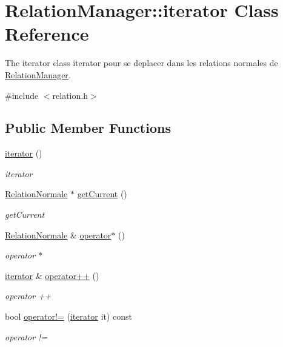 \hypertarget{class_relation_manager_1_1iterator}{}\section{Relation\+Manager\+:\+:iterator Class Reference}
\label{class_relation_manager_1_1iterator}


The iterator class iterator pour se deplacer dans les relations normales de \hyperlink{class_relation_manager}{Relation\+Manager}.  




{\ttfamily \#include $<$relation.\+h$>$}

\subsection*{Public Member Functions}
\begin{DoxyCompactItemize}
\item 
\mbox{\label{class_relation_manager_1_1iterator_a080be746b159c37d0d7b1d825c2f1866}} 
\hyperlink{class_relation_manager_1_1iterator_a080be746b159c37d0d7b1d825c2f1866}{iterator} ()
\begin{DoxyCompactList}\small\item\em iterator \end{DoxyCompactList}\item 
\hyperlink{class_relation_normale}{Relation\+Normale} $\ast$ \hyperlink{class_relation_manager_1_1iterator_a42d061ad754cc0441107c7699dbda256}{get\+Current} ()
\begin{DoxyCompactList}\small\item\em get\+Current \end{DoxyCompactList}\item 
\hyperlink{class_relation_normale}{Relation\+Normale} \& \hyperlink{class_relation_manager_1_1iterator_aa3e467a4308e8c8f58564d68caebafbb}{operator$\ast$} ()
\begin{DoxyCompactList}\small\item\em operator $\ast$ \end{DoxyCompactList}\item 
\hyperlink{class_relation_manager_1_1iterator}{iterator} \& \hyperlink{class_relation_manager_1_1iterator_a0aef75ae2f7e66f9f510b559c0a73653}{operator++} ()
\begin{DoxyCompactList}\small\item\em operator ++ \end{DoxyCompactList}\item 
bool \hyperlink{class_relation_manager_1_1iterator_a0f35589da6b054d5441547cf5e040b7f}{operator!=} (\hyperlink{class_relation_manager_1_1iterator}{iterator} it) const
\begin{DoxyCompactList}\small\item\em operator != \end{DoxyCompactList}\end{DoxyCompactItemize}
